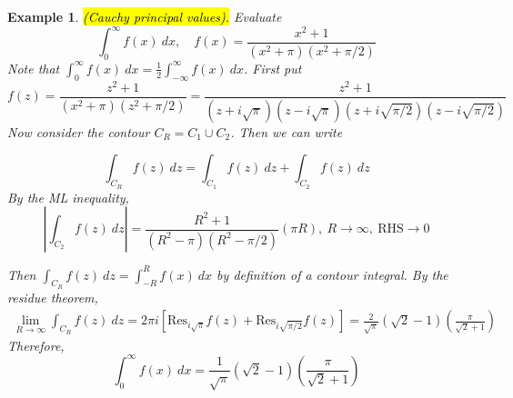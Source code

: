 \documentclass{article}
\newtheorem{example}[theorem]{Example}
\theoremstyle{definition}
\begin{document}
\begin{example} \label{ex:contour} \normalfont
    \hl{(Cauchy principal values).} Evaluate
    \begin{equation*}
        \int_0^\infty f(x)\ dx, \quad f(x) = \frac{x^2 + 1}{(x^2+\pi)(x^2+\pi/2)}
    \end{equation*}
    Note that $\int_0^\infty f(x)\ dx = \frac{1}{2} \int_{-\infty}^\infty f(x)\ dx$. First put
    \begin{equation*}
        f(z) = \frac{z^2+1}{(x^2 + \pi)(z^2 + \pi/2)} = \frac{z^2+1}{(z+i\sqrt{\pi})(z-i\sqrt{\pi})(z+i\sqrt{\pi/2})(z-i\sqrt{\pi/2})}
    \end{equation*}
    Now consider the contour $C_R = C_1 \cup C_2$. Then we can write

    \begin{minipage}{0.35\textwidth}
        \centering
    \end{minipage}
    \hfill
    \begin{minipage}{0.6\textwidth}
        \begin{equation*}
            \int_{C_R} f(z)\ dz = \int_{C_1} f(z)\ dz + \int_{C_2} f(z)\ dz
        \end{equation*}
        By the ML inequality,
        \begin{equation*}
            \left| \int_{C_2} f(z)\ dz \right| = \frac{R^2+1}{(R^2-\pi)(R^2-\pi/2)} (\pi R),\ R \to \infty,\ \text{RHS} \to 0
        \end{equation*}
    \end{minipage}
    Then $\int_{C_R} f(z)\ dz = \int_{-R}^R f(x)\ dx$ by definition of a contour integral. By the residue theorem,
    \begin{align*}
        \lim_{R \to \infty} \int_{C_R} f(z)\ dz = 2 \pi i \left[ \text{Res}_{i\sqrt{\pi}} f(z) + \text{Res}_{i\sqrt{\pi/2}} f(z) \right] = \frac{2}{\sqrt{\pi}} (\sqrt{2}-1)\left( \frac{\pi}{\sqrt{2} + 1} \right)
    \end{align*}
    Therefore,
    \begin{equation*}
        \int_0^\infty f(x)\ dx = \frac{1}{\sqrt{\pi}} (\sqrt{2}-1)\left( \frac{\pi}{\sqrt{2} + 1} \right)
    \end{equation*}
\end{example}
\end{document}

